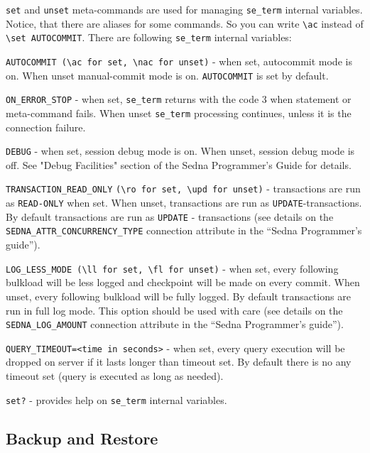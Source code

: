 \documentclass[a4paper,12pt]{article}
\begin{document}
\verb!set! and \verb!unset! meta-commands are used for managing \verb!se_term!
internal variables. Notice, that there are aliases for some commands. So you can
write \verb!\ac! instead of \verb!\set AUTOCOMMIT!. There are following
\verb!se_term! internal variables:

\verb!AUTOCOMMIT (\ac for set, \nac for unset)! - when set, autocommit mode is
on. When unset manual-commit mode is on. \verb!AUTOCOMMIT! is set by default.

\verb!ON_ERROR_STOP! - when set, \verb!se_term! returns with the code 3 when
statement or meta-command fails. When unset \verb!se_term! processing continues,
unless it is the connection failure.

\verb!DEBUG! - when set, session debug mode is on. When unset, session debug
mode is off. See "Debug Facilities" section of the Sedna Programmer's Guide for
details.

\verb!TRANSACTION_READ_ONLY! \verb!(\ro for set, \upd for unset)! - transactions
are run as \verb!READ-ONLY! when set. When unset, transactions are run as
\verb!UPDATE!-transactions. By default transactions are run as \verb!UPDATE! -
transactions (see details on the \verb!SEDNA_ATTR_CONCURRENCY_TYPE! connection
attribute in the ``Sedna Programmer's guide'').

\verb!LOG_LESS_MODE (\ll for set, \fl for unset)! - when set, every following
bulkload will be less logged and checkpoint will be made on every commit. When
unset, every following bulkload will be fully logged. By default transactions
are run in full log mode. This option should be used with care (see details
on the \verb!SEDNA_LOG_AMOUNT! connection attribute in the ``Sedna Programmer's
guide'').

\verb!QUERY_TIMEOUT=<time in seconds>! - when set, every query execution will be
dropped on server if it lasts longer than timeout set. By default there is no
any timeout set (query is executed as long as needed).

\verb!set?! - provides help on \verb!se_term! internal variables.


\subsection{Backup and Restore}
\end{document}

